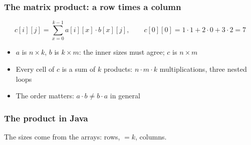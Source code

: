 \documentclass[aspectratio=169,10pt,compress]{beamer}
\begin{document}




\begin{frame}[t,fragile] \frametitle{The matrix product: a row times a column}
	\begin{center}
	\end{center}
	\[
		c[i][j] = \sum_{x=0}^{k-1} a[i][x] \cdot b[x][j], \qquad c[0][0] = 1 \cdot 1 + 2 \cdot 0 + 3 \cdot 2 = 7
	\]
	\begin{itemize}\small
		\item $a$ is $n \times k$, $b$ is $k \times m$: the inner sizes must agree; $c$ is $n \times m$
		\item Every cell of $c$ is a sum of $k$ products: $n \cdot m \cdot k$ multiplications, three nested loops
		\item The order matters: $a \cdot b \ne b \cdot a$ in general
	\end{itemize}
\end{frame}




\begin{frame}[t,fragile] \frametitle{The product in Java}

	\footnotesize The sizes come from the arrays:  rows,  $= k$,  columns.
\end{frame}
\end{document}
